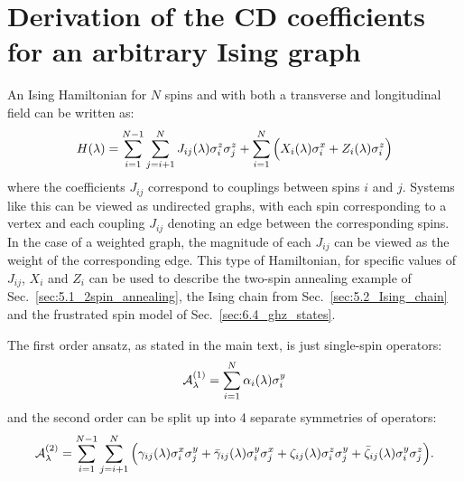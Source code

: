 \chapter{Derivation of the CD coefficients for an arbitrary Ising graph}\label{app:arbitrary_ising_derivation}

An Ising Hamiltonian for $N$ spins and with both a transverse and longitudinal field can be written as:
\begin{equation}\label{eq:ising_hamiltonian}
    H(\lambda) = \sum_{i = 1}^{N-1}\sum_{j = i+1}^{N} J_{ij}(\lambda) \sigma^z_i \sigma^z_j + \sum_{i = 1}^{N} \Big( X_i(\lambda) \sigma^x_i + Z_i(\lambda) \sigma^z_i \Big)
\end{equation}
where the coefficients $J_{ij}$ correspond to couplings between spins $i$ and $j$. Systems like this can be viewed as undirected graphs, with each spin corresponding to a vertex and each coupling $J_{ij}$ denoting an edge between the corresponding spins. In the case of a weighted graph, the magnitude of each $J_{ij}$ can be viewed as the weight of the corresponding edge. This type of Hamiltonian, for specific values of $J_{ij}$, $X_i$ and $Z_i$ can be used to describe the two-spin annealing example of Sec.~\ref{sec:5.1_2spin_annealing}, the Ising chain from Sec.~\ref{sec:5.2_Ising_chain} and the frustrated spin model of Sec.~\ref{sec:6.4_ghz_states}. 

The first order  ansatz, as stated in the main text, is just single-spin operators:
\begin{equation}\label{eq:spin_agp_1storder}
    \mathcal{A}_{\lambda}^{(1)} = \sum_{i = 1}^N \alpha_i(\lambda) \sigma^y_i
\end{equation}
and the second order can be split up into 4 separate symmetries of operators:
\begin{equation}\label{eq:spin_agp_2ndorder}
        \mathcal{A}_{\lambda}^{(2)} = \sum_{i = 1}^{N-1}\sum_{j = i+1}^{N} \Big( \gamma_{ij}(\lambda) \sigma^x_i \sigma^y_j + \Bar{\gamma}_{ij}(\lambda) \sigma^y_i \sigma^x_j + \zeta_{ij}(\lambda) \sigma^z_i \sigma^y_j + \Bar{\zeta}_{ij}(\lambda) \sigma^y_i \sigma^z_j \Big).
\end{equation}

